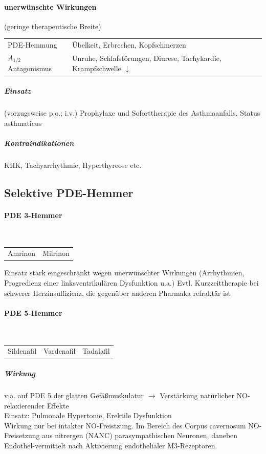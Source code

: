 \documentclass[10pt,a4paper]{report}
\begin{document}
\paragraph{unerwünschte Wirkungen}(geringe therapeutische Breite) 
\begin{tabularx}{\textwidth}{XX}
PDE-Hemmung&Übelkeit, Erbrechen, Kopfschmerzen\\ 
$A_{1/2}$ Antagonismus&Unruhe, Schlafstörungen, Diurese, Tachykardie,  Krampfschwelle $\downarrow$\\
\end{tabularx}

\subparagraph{Einsatz}(vorzugsweise p.o.; i.v.) Prophylaxe und Soforttherapie des Asthmaanfalls, Status asthmaticus 

\subparagraph{Kontraindikationen} KHK, Tachyarrhythmie, Hyperthyreose etc.

\subsection{Selektive PDE-Hemmer}
\paragraph{PDE 3-Hemmer} \mbox{} \\
\begin{tabularx}{\textwidth}{XX}
Amrinon&Milrinon\\
\end{tabularx}

Einsatz stark eingeschränkt wegen unerwünschter Wirkungen (Arrhythmien, Progredienz einer linksventrikulären Dysfunktion u.a.)
Evtl. Kurzzeittherapie bei schwerer Herzinsuffizienz, die gegenüber anderen Pharmaka refraktär ist

\paragraph{PDE 5-Hemmer} \mbox{} \\
\begin{tabularx}{\textwidth}{XXX}
Sildenafil&Vardenafil&Tadalafil\\
\end{tabularx}

\subparagraph{Wirkung}
v.a. auf PDE 5 der glatten Gefäßmuskulatur
$\rightarrow$ Verstärkung natürlicher NO-relaxierender Effekte \\  
Einsatz: Pulmonale Hypertonie,	Erektile Dysfunktion\\
Wirkung nur bei intakter NO-Freistzung.  Im Bereich des Corpus cavernosum NO-Freisetzung aus nitrergen (NANC) parasympathischen Neuronen, daneben Endothel-vermittelt nach Aktivierung endothelialer M3-Rezeptoren.
\end{document}
